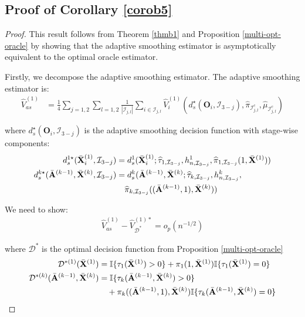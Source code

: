 \documentclass[11pt]{article}
\theoremstyle{referenceplain}
\theoremstyle{referencedefinition}
\theoremstyle{referenceremark}
\begin{document}
\subsection{Proof of Corollary \ref{corob5}}
\begin{proof}
This result follows from Theorem \ref{thmb1} and Proposition \ref{multi-opt-oracle} by showing that the adaptive smoothing estimator is asymptotically equivalent to the optimal oracle estimator.


Firstly, we decompose the adaptive smoothing estimator. The adaptive smoothing estimator is:
\begin{align*}
    \widehat{V}_{as}^{(1)} &= \frac{1}{4}\sum_{j=1,2}\sum_{l=1,2}\frac{1}{|\mathcal{I}_{j,l}|}\sum_{i\in\mathcal{I}_{j,l}}\widehat{V}_i^{(1)}(d_{s}^{\star}(\mathbf{O}_i,\mathcal{I}_{3-j}),\widehat{\pi}_{\mathcal{I}_{j,l}^c},\widehat{\mu}_{\mathcal{I}_{j,l}^c})
\end{align*}

where $d_{s}^{\star}(\mathbf{O}_i,\mathcal{I}_{3-j})$ is the adaptive smoothing decision function with stage-wise components:
\begin{align}
    d_{s}^{1\star}(\bar{\mathbf{X}}_i^{(1)},\mathcal{I}_{3-j}) &= d_{s}^1(\bar{\mathbf{X}}_i^{(1)};\widehat{\tau}_{1,\mathcal{I}_{3-j}},h_{n,\mathcal{I}_{3-j}}^1, \widehat{\pi}_{1,\mathcal{I}_{3-j}}(1,\bar{\mathbf{X}}^{(1)}))\label{multi-as-1}\\
    d_{s}^{k\star}(\bar{\mathbf{A}}^{(k-1)},\bar{\mathbf{X}}^{(k)},\mathcal{I}_{3-j}) &= d_{s}^k(\bar{\mathbf{A}}^{(k-1)},\bar{\mathbf{X}}^{(k)};\widehat{\tau}_{k,\mathcal{I}_{3-j}},h_{n,\mathcal{I}_{3-j}}^k,\notag\\
    &\quad\widehat{\pi}_{k,\mathcal{I}_{3-j}}((\bar{\mathbf{A}}^{(k-1)},1),\bar{\mathbf{X}}^{(k)}))\label{multi-as-k}
\end{align}


We need to show:
\begin{align*}
    \widehat{V}_{as}^{(1)} - \widehat{V}_{\mathcal{D}^*}^{(1)*} = o_p(n^{-1/2})
\end{align*}

where $\mathcal{D}^*$ is the optimal decision function from Proposition \ref{multi-opt-oracle}
\begin{align}
    \mathcal{D}^{*(1)}(\bar{\mathbf{X}}^{(1)}) &= \mathbb{I}\{\tau_1(\bar{\mathbf{X}}^{(1)}) > 0\} + \pi_1(1,\bar{\mathbf{X}}^{(1)})\mathbb{I}\{\tau_1(\bar{\mathbf{X}}^{(1)}) = 0\}\label{multi-opt-1}\\
    \mathcal{D}^{*(k)}(\bar{\mathbf{A}}^{(k-1)},\bar{\mathbf{X}}^{(k)}) &= \mathbb{I}\{\tau_k(\bar{\mathbf{A}}^{(k-1)},\bar{\mathbf{X}}^{(k)}) > 0\}\notag\\
    &\quad + \pi_k((\bar{\mathbf{A}}^{(k-1)},1),\bar{\mathbf{X}}^{(k)})\mathbb{I}\{\tau_k(\bar{\mathbf{A}}^{(k-1)},\bar{\mathbf{X}}^{(k)}) = 0\}\label{multi-opt-k}
\end{align}


\end{proof}
\end{document}
